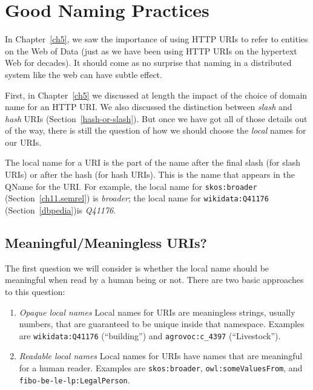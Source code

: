

\section{Good Naming Practices}
\label{ch15Naming}

In Chapter~\ref{ch5}, we saw the importance of using HTTP URIs to refer to entities
on the Web of Data (just as we have been using HTTP URIs on the hypertext Web for decades).
It should come as no surprise that naming in a distributed system like the web
can have subtle effect. 

First, in Chapter~\ref{ch5} we discussed at length the impact of the choice of 
domain name for an HTTP URI.   We also discussed the distinction between \emph{slash} and 
\emph{hash} URIs (Section~\ref{hash-or-slash}).  But once we have got all of those details 
out of the way, there is still the question of how we should choose the \emph{local} names 
for our URIs. 

The local name for a URI is the part of the name after the final slash (for slash URIs) or 
after the hash (for hash URIs).  This is the name that appears in the QName for the URI. 
For example, the local name for \texttt{skos:broader}  (Section~\ref{ch11.semrel}) is 
\emph{broader}; the local name for \texttt{wikidata:Q41176} (Section~\ref{dbpedia})is 
\emph{Q41176}. 

\subsection{Meaningful/Meaningless URIs?}

The first question we will consider is whether the local name should be meaningful
when read by a human being or not.  There are two basic approaches to this question: 

\begin{enumerate}
    \item \emph{Opaque local names} Local names for URIs are meaningless strings, usually numbers, that are guaranteed to be unique inside that namespace.  Examples are \texttt{wikidata:Q41176} (``building'') and \texttt{agrovoc:c\_4397} (``Livestock''). 
    \item \emph{Readable local names} Local names for URIs have names that are meaningful
    for a human reader.  Examples are \texttt{skos:broader}, \texttt{owl:someValuesFrom}, and \texttt{fibo-be-le-lp:LegalPerson}.
\end{enumerate}

